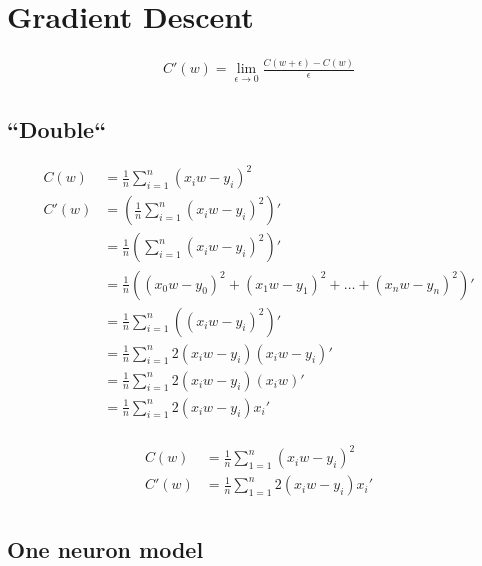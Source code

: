 \documentclass{article}
\begin{document}
\section{Gradient Descent}
\def\avgsum[#1,#2]{\frac{1}{#2}\sum_{#1=1}^{#2}}

\begin{align}
	C'(w) = \lim_{\epsilon \to 0}\frac{C(w + \epsilon) - C(w)}{\epsilon}
\end{align}

\subsection{``Double``}

\begin{align}
	C(w)  &= \avgsum[i,n](x_iw - y_i)^2 \\  
	C'(w) &= \left(\avgsum[i,n](x_iw - y_i)^2\right)' \\
		  &= \frac{1}{n}\left(\sum_{i=1}^{n}(x_iw - y_i)^2\right)' \\
		  &= \frac{1}{n}\left((x_0w - y_0)^2 + (x_1w - y_1)^2 + \hdots+(x_nw - y_n)^2\right)' \\
		  &= \avgsum[i,n]\left((x_iw - y_i)^2\right)' \\
		  &= \avgsum[i,n]2(x_iw - y_i)\left(x_iw - y_i\right)' \\
		  &= \avgsum[i,n]2(x_iw - y_i)\left(x_iw\right)' \\
		  &= \avgsum[i,n]2(x_iw - y_i)x_i' \\
\end{align}

\begin{align}
	C(w)  &= \avgsum[1,n](x_iw - y_i)^2 \\  
	C'(w) &= \avgsum[1,n]2(x_iw - y_i)x_i' \\
\end{align}

\subsection{One neuron model}

\def\d{1.5}

\begin{center}
\end{center}
\end{document}
